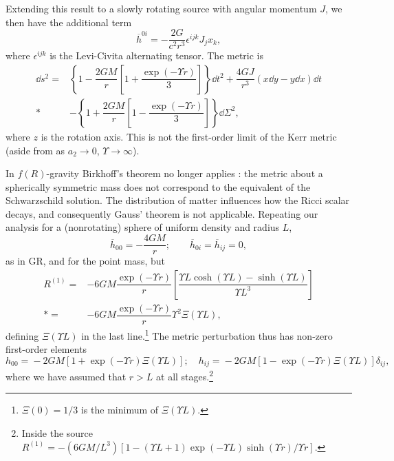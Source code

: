 Extending this result to a slowly rotating source with angular momentum $J$, we then have the additional term \citep[section 13.20]{Hobson2006}
\begin{equation}
\overline{h}^{0i} = -\dfrac{2G}{c^2r^3} \epsilon^{ijk}J_j x_k,
\end{equation}
where $\epsilon^{ijk}$ is the Levi-Civita alternating tensor. The metric is
\begin{align}
\dd s^2 = {} & \left\{1-\dfrac{2GM}{r}\left[1 + \dfrac{\exp(- \Upsilon r)}{3}\right]\right\}\dd t^2 + \dfrac{4GJ}{r^3}\left(x\dd y - y\dd x\right)\dd t \nonumber \\*
 & - {} \left\{1 +\dfrac{2GM}{r}\left[1 - \dfrac{\exp(- \Upsilon r)}{3}\right]\right\}\dd \Sigma^2,\label{eq:f(R)_Kerr}
\end{align}
where $z$ is the rotation axis. This is not the first-order limit of the Kerr metric (aside from as $a_2 \rightarrow 0$, $\Upsilon \rightarrow \infty$).

In $f(R)$-gravity Birkhoff's theorem no longer applies \citep{Pechlaner1966, Stelle1978, Clifton2006, Capozziello2009b, Stabile2010}: the metric about a spherically symmetric mass does not correspond to the equivalent of the Schwarzschild solution. The distribution of matter influences how the Ricci scalar decays, and consequently Gauss' theorem is not applicable. Repeating our analysis for a (nonrotating) sphere of uniform density and radius $L$,
\begin{equation}
\overline{h}_{00} = -\dfrac{4GM}{r}; \qquad \overline{h}_{0i} = \overline{h}_{ij} = 0,
\end{equation}
as in GR, and for the point mass, but
\begin{align}
R^{(1)} = {} & -6 G M \dfrac{\exp(- \Upsilon r)}{r}\left[\dfrac{\Upsilon L\cosh(\Upsilon L) - \sinh(\Upsilon L)}{\Upsilon L^3}\right] \nonumber \\*
 = {} &  -6 G M \dfrac{\exp(- \Upsilon r)}{r}\Upsilon^2\Xi(\Upsilon L),
\end{align}
defining $\Xi(\Upsilon L)$ in the last line.\footnote{$\Xi(0) = 1/3$ is the minimum of $\Xi(\Upsilon L)$.} The metric perturbation thus has non-zero first-order elements \citep{Stelle1978, Capozziello2009b, Stabile2010}
\begin{equation}
h_{00} = {} -2 G M \left[1 + \exp(- \Upsilon r)\Xi(\Upsilon L)\right]; \quad
h_{ij} = {} -2 G M \left[1 - \exp(- \Upsilon r)\Xi(\Upsilon L)\right]\delta_{ij},
\label{eq:Uniform}
\end{equation}
where we have assumed that $r > L$ at all stages.\footnote{Inside the source $R^{(1)} = -{(6 G M/{L^3})}[1 - (\Upsilon L + 1)\exp(-\Upsilon L) \sinh(\Upsilon r)/\Upsilon r]$.}

